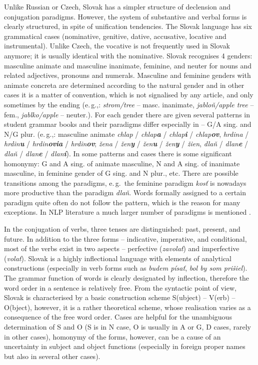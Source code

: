 \begin{multicols}{2}
Unlike Russian or Czech, Slovak has a simpler structure of declension and conjugation paradigms. However, the system of substantive and verbal forms is clearly structured, in spite of unification tendencies. The Slovak language has six grammatical cases (nominative, genitive, dative, accusative, locative and instrumental). Unlike Czech, the vocative is not frequently used in Slovak anymore; it is usually identical with the nominative. Slovak recognises 4 genders: masculine animate and masculine inanimate, feminine, and neuter for nouns and related adjectives, pronouns and numerals. Masculine and feminine genders with animate concreta are determined according to the natural gender and in other cases it is a matter of convention, which is not signalised by any article, and only sometimes by the ending (e.\,g.,: \emph{strom/tree} – masc. inanimate, \emph{jabloň/apple tree} – fem., \emph{jablko/apple} – neuter.). For each gender there are given several patterns in student grammar books and their paradigms differ especially in –  G/A sing. and N/G plur. (e.\,g.,: masculine animate \emph{chlap} / \emph{chlap\textbf{a}} / \emph{chlap\textbf{i}} / \emph{chlap\textbf{ov}}, \emph{hrdina} / \emph{hrdin\textbf{u}} / \emph{hrdin\textbf{ovia}} / \emph{hrdin\textbf{ov}}; \emph{žena} / \emph{žen\textbf{y}} / \emph{žen\textbf{u}} / \emph{žen\textbf{y}} / \emph{žien}, \emph{dlaň} / \emph{dlan\textbf{e}} / \emph{dlaň} / \emph{dlan\textbf{e}} / \emph{dlan\textbf{í}}). In some patterns and cases there is some significant homonymy: G and A sing. of animate masculine, N and A sing. of inanimate masculine, in feminine gender of G sing. and N plur., etc. There are possible transitions among the paradigms, e.\,g.~the feminine paradigm \emph{kosť} is nowadays more productive than the paradigm \emph{dlaň}. Words formally assigned to a certain paradigm quite often do not follow the pattern, which is the reason for many exceptions. In NLP literature a much larger number of paradigms is mentioned \cite{pales1994,sokolova1999,sokolova2007a}.

In the conjugation of verbs, three tenses are distinguished: past, present, and future. In addition to the three forms – indicative, imperative, and conditional, most of the verbs exist in two aspects – perfective (\emph{zavolať}) and imperfective (\emph{volať}). Slovak is a highly inflectional language with elements of analytical constructions (especially in verb forms such as \emph{budem písať}, \emph{bol by som prišiel}). The grammar function of words is clearly designated by inflection, therefore the word order in a sentence is relatively free. From the syntactic point of view, Slovak is characterised by a basic construction scheme S(ubject) – V(erb) – O(bject), however, it is a rather theoretical scheme, whose realisation varies as a consequence of the free word order. Cases are helpful for the unambiguous determination of S and O (S is in N case, O is usually in A or G, D cases, rarely in other cases), homonymy of the forms, however, can be a cause of an uncertainty in subject and object functions (especially in foreign proper names but also in several other cases). 


\end{multicols}
